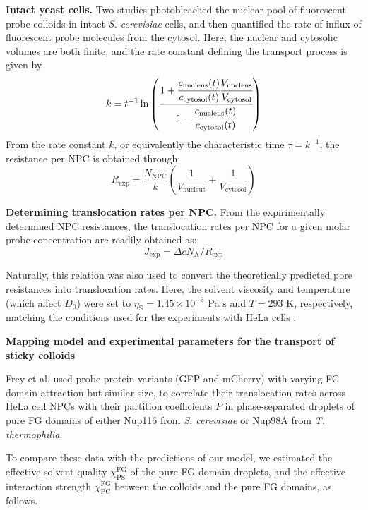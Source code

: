 \documentclass[10pt, a4paper, twocolumn]{article}
\begin{document}
\bigskip\noindent
\textbf{Intact yeast cells.}
Two studies \cite{Popken2015,Timney2016} photobleached the nuclear pool of fluorescent probe colloids in intact \textit{S. cerevisiae} cells, and then quantified the rate of influx of fluorescent probe molecules from the cytosol.
Here, the nuclear and cytosolic volumes are both finite, and the rate constant defining the transport process is given by
\begin{equation}
    k = t^{-1}\ln
    \left(
        \cfrac{1 + \cfrac{c_\text{nucleus}(t)}{c_\text{cytosol}(t)}
        \cfrac{V_\text{nucleus}}{V_\text{cytosol}}}
        {1 - \cfrac{c_\text{nucleus}(t)}{c_\text{cytosol}(t)}}
    \right)
\end{equation}
From the rate constant $k$, or equivalently the characteristic time $\tau = k^{-1}$, the resistance per NPC is obtained through:
\begin{equation}
    R_\text{exp} = \frac{N_\text{NPC}}{k} 
    \left(\frac{1}{V_\text{nucleus}} + \frac{1}{V_\text{cytosol}}\right)
    \label{eq:Exp_Resistance_2}
\end{equation} 

\bigskip\noindent
\textbf{Determining translocation rates per NPC.}
From the expirimentally determined NPC resistances, the translocation rates per NPC for a given molar probe concentration are readily obtained as:
\begin{equation}
    J_\text{exp} = \Delta c N_\text{A} / R_\text{exp}
    \label{eq:Translocation_rate}
\end{equation}

Naturally, this relation was also used to convert the theoretically predicted pore resistances into translocation rates.
Here, the solvent viscosity and temperature (which affect $D_0$) were set to $\eta_{\text{S}} = 1.45 \times 10^{-3} \text{ Pa s}$ and $T = 293 \text{ K}$, respectively, matching the conditions used for the experiments with HeLa cells \cite{Ribbeck2001}.

\bigskip\noindent
\textbf{Mapping model and experimental parameters for the transport of sticky colloids} 

Frey et al. \cite{Frey2018} used probe protein variants (GFP and mCherry) with varying FG domain attraction but similar size, to correlate their translocation rates across HeLa cell NPCs with their partition coefficients $P$ in phase-separated droplets of pure FG domains of either Nup116 from \textit{S. cerevisiae} or Nup98A from \textit{T. thermophilia}.

To compare these data with the predictions of our model, we estimated the effective solvent quality $\chi_\text{PS}^\text{FG}$ of the pure FG domain droplets, and the effective interaction strength $\chi_\text{PC}^\text{FG}$  between the colloids and the pure FG domains, as follows.
\end{document}
